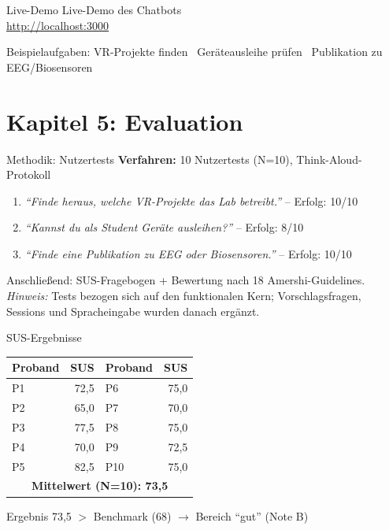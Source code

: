 \documentclass[14pt,aspectratio=169]{beamer}
\begin{document}
\begin{frame}{Live-Demo}
    \centering
    \Large
    \alert{Live-Demo des Chatbots}\\
    \vspace{0.5cm}
    \normalsize
    \url{http://localhost:3000}
    \vspace{0.5cm}

    \small
  Beispielaufgaben: VR-Projekte finden \textbullet\ Geräteausleihe prüfen \textbullet\ Publikation zu EEG/Biosensoren
\end{frame}

\section{Kapitel 5: Evaluation}

\begin{frame}{Methodik: Nutzertests}
    \textbf{Verfahren:} 10 Nutzertests (N=10), Think-Aloud-Protokoll
    \begin{enumerate}
        \item \textit{``Finde heraus, welche VR-Projekte das Lab betreibt.''} -- Erfolg: 10/10
        \item \textit{``Kannst du als Student Geräte ausleihen?''} -- Erfolg: 8/10
        \item \textit{``Finde eine Publikation zu EEG oder Biosensoren.''} -- Erfolg: 10/10
    \end{enumerate}
    \vspace{0.3cm}
    Anschließend: SUS-Fragebogen + Bewertung nach 18 Amershi-Guidelines.\\
    \small\textit{Hinweis:} Tests bezogen sich auf den funktionalen Kern; Vorschlagsfragen, Sessions und Spracheingabe wurden danach ergänzt.
\end{frame}

\begin{frame}{SUS-Ergebnisse}
    \centering
    \footnotesize
    \begin{tabular}{lr|lr}
        \toprule
        \textbf{Proband} & \textbf{SUS} & \textbf{Proband} & \textbf{SUS} \\
        \midrule
        P1 & 72,5 & P6 & 75,0 \\
        P2 & 65,0 & P7 & 70,0 \\
        P3 & 77,5 & P8 & 75,0 \\
        P4 & 70,0 & P9 & 72,5 \\
        P5 & 82,5 & P10 & 75,0 \\
        \midrule
        \multicolumn{4}{c}{\textbf{Mittelwert (N=10): 73,5}} \\
        \bottomrule
    \end{tabular}
    \vspace{0.5cm}
    \begin{alertblock}{Ergebnis}
        73,5 $>$ Benchmark (68) $\rightarrow$ Bereich ``gut'' (Note B)
    \end{alertblock}
\end{frame}
\end{document}
